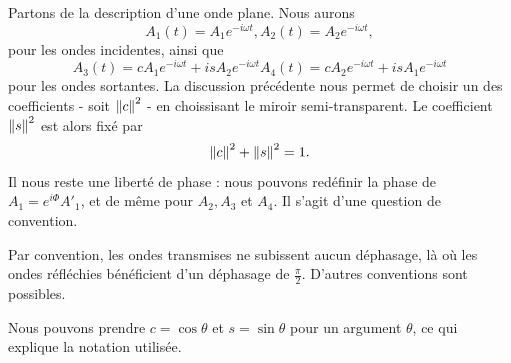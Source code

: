 \documentclass[../notesdecours.tex]{subfiles}
\begin{document}
Partons de la description d'une onde plane. Nous aurons
\begin{subequations}
\begin{equation}
A_1 (t) = A_1e^{-i\omega t},
\end{equation}
\begin{equation}
A_2 (t) = A_2e^{-i\omega t},
\end{equation}
\end{subequations}
pour les ondes incidentes, ainsi que
\begin{subequations}
\begin{equation}
A_3 (t) = cA_1e^{-i\omega t} + i s A_2e^{-i\omega t}
\end{equation}
\begin{equation}
A_4 (t) = c A_2e^{-i\omega t} + i sA_1e^{-i\omega t}
\end{equation}
\end{subequations}
pour les ondes sortantes. La discussion précédente nous permet de choisir un des coefficients - soit $\norm{c}^2$ - en choissisant le miroir semi-transparent. Le coefficient $\norm{s}^2$ est alors fixé par
\begin{equation}
\norm{c}^2 + \norm{s}^2 = 1.
\end{equation}
Il nous reste une liberté de phase : nous pouvons redéfinir la phase de $A_1 = e^{i \Phi}A'_1$, et de même pour $A_2, A_3$ et $A_4$. Il s'agit d'une question de convention.
\begin{remark} Par convention, les ondes transmises ne subissent aucun déphasage, là où les ondes réfléchies bénéficient d'un déphasage de $\frac{\pi}{2}$. D'autres conventions sont possibles.\end{remark}

\begin{remark} Nous pouvons prendre $c = \cos\theta$ et $s = \sin\theta$ pour un argument $\theta$, ce qui explique la notation utilisée. \end{remark}
\end{document}
